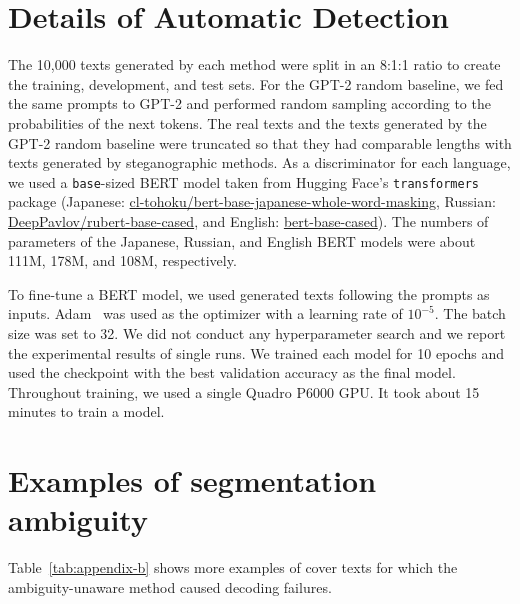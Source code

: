 \documentclass[11pt]{article}
\begin{document}




\newpage
\appendix
\setcounter{table}{0}
\renewcommand{\thetable}{A.\arabic{table}}


\section{Details of Automatic Detection} \label{sec:appendix-a}
The 10,000 texts generated by each method were split in an 8:1:1 ratio to create the training, development, and test sets.
For the GPT-2 random baseline, we fed the same prompts to GPT-2 and performed random sampling according to the probabilities of the next tokens.
The real texts and the texts generated by the GPT-2 random baseline were truncated so that they had comparable lengths with texts generated by steganographic methods.
As a discriminator for each language, we used a \texttt{base}-sized BERT model taken from Hugging Face’s \texttt{transformers} package (Japanese: \href{https://huggingface.co/cl-tohoku/bert-base-japanese-whole-word-masking}{cl-tohoku/bert-base-japanese-whole-word-masking}, Russian: \href{https://huggingface.co/DeepPavlov/rubert-base-cased}{DeepPavlov/rubert-base-cased}, and English: \href{https://huggingface.co/bert-base-cased}{bert-base-cased}).
The numbers of parameters of the Japanese, Russian, and English BERT models were about 111M, 178M, and 108M, respectively.

To fine-tune a BERT model, we used generated texts following the prompts as inputs.
Adam~\citep{kingma2015adam} was used as the optimizer with a learning rate of $10^{-5}$.
The batch size was set to 32.
We did not conduct any hyperparameter search and we report the experimental results of single runs.
We trained each model for 10 epochs and used the checkpoint with the best validation accuracy as the final model.
Throughout training, we used a single Quadro P6000 GPU. It took about 15 minutes to train a model.

\section{Examples of segmentation ambiguity} \label{sec:appendix-b}
Table~\ref{tab:appendix-b} shows more examples of cover texts for which the ambiguity-unaware method caused decoding failures.
\end{document}
